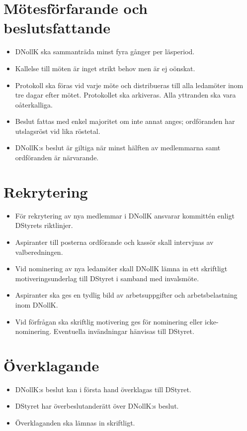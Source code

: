 \documentclass[a4paper]{dtekinstruktion}
\begin{document}
\section{Mötesförfarande och beslutsfattande}
\begin{itemize}
  \item DNollK ska sammanträda minst fyra gånger per läsperiod.
  \item Kallelse till möten är inget strikt behov men är ej oönskat.
  \item Protokoll ska föras vid varje möte och distribueras till alla ledamöter inom tre dagar efter mötet. Protokollet ska arkiveras. Alla yttranden ska vara oåterkalliga.
  \item Beslut fattas med enkel majoritet om inte annat anges; ordföranden har utslagsröst vid lika röstetal.
  \item DNollK:s beslut är giltiga när minst hälften av medlemmarna samt ordföranden är närvarande.
\end{itemize}

\section{Rekrytering}
\begin{itemize}
  \item För rekrytering av nya medlemmar i DNollK ansvarar kommittén enligt DStyrets riktlinjer.
  \item Aspiranter till posterna ordförande och kassör skall intervjuas av valberedningen.
  \item Vid nominering av nya ledamöter skall DNollK lämna in ett skriftligt motiveringsunderlag till DStyret i samband med invalsmöte.
  \item Aspiranter ska ges en tydlig bild av arbetsuppgifter och arbetsbelastning inom DNollK.
  \item Vid förfrågan ska skriftlig motivering ges för nominering eller icke-nominering. Eventuella invändningar hänvisas till DStyret.
\end{itemize}

\section{Överklagande}
\begin{itemize}
  \item DNollK:s beslut kan i första hand överklagas till DStyret.
  \item DStyret har överbeslutanderätt över DNollK:s beslut.
  \item Överklaganden ska lämnas in skriftligt.
\end{itemize}
\end{document}
